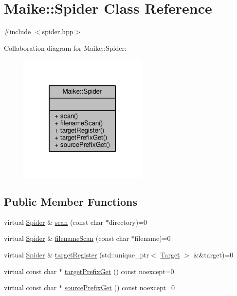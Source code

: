 \hypertarget{class_maike_1_1_spider}{}\section{Maike\+:\+:Spider Class Reference}
\label{class_maike_1_1_spider}


{\ttfamily \#include $<$spider.\+hpp$>$}



Collaboration diagram for Maike\+:\+:Spider\+:\nopagebreak
\begin{figure}[H]
\begin{center}
\leavevmode
\includegraphics[width=182pt]{class_maike_1_1_spider__coll__graph}
\end{center}
\end{figure}
\subsection*{Public Member Functions}
\begin{DoxyCompactItemize}
\item 
virtual \hyperlink{class_maike_1_1_spider}{Spider} \& \hyperlink{class_maike_1_1_spider_aae962c763a5e8541c93661487fc7d99a}{scan} (const char $\ast$directory)=0
\item 
virtual \hyperlink{class_maike_1_1_spider}{Spider} \& \hyperlink{class_maike_1_1_spider_a548a255dacdd298d93a53537283404f4}{filename\+Scan} (const char $\ast$filename)=0
\item 
virtual \hyperlink{class_maike_1_1_spider}{Spider} \& \hyperlink{class_maike_1_1_spider_af28c61e85a9b9235d957cb8641b99648}{target\+Register} (std\+::unique\+\_\+ptr$<$ \hyperlink{class_maike_1_1_target}{Target} $>$ \&\&target)=0
\item 
virtual const char $\ast$ \hyperlink{class_maike_1_1_spider_a9b0d76b47e9aab5d69cd5aac08e77a85}{target\+Prefix\+Get} () const noexcept=0
\item 
virtual const char $\ast$ \hyperlink{class_maike_1_1_spider_a0376d7b089a79cbb31d15d5fe7d17650}{source\+Prefix\+Get} () const noexcept=0
\end{DoxyCompactItemize}


